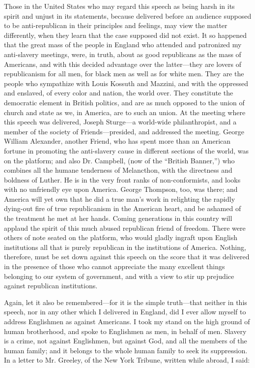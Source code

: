 Those in the United States who may regard this speech as being harsh in
its spirit and unjust in its statements, because delivered before an
audience supposed to be anti-republican in their principles and
feelings, may view the matter differently, when they learn that the case
supposed did not exist. It so happened that the great mass of the people
in England who attended and patronized my anti-slavery meetings, were,
in truth, about as good republicans as the mass of Americans, and with
this decided advantage over the latter---they are lovers of
republicanism for all men, for black men as well as for white men. They
are the people who sympathize with Louis Kossuth and Mazzini, and with
the oppressed and enslaved, of every color and nation, the world over.
They constitute the democratic element in British politics, and are as
much opposed to the {}union of church and state as we, in America, are
to such an union. At the meeting where this speech was delivered, Joseph
Sturge---a world-wide philanthropist, and a member of the society of
Friends---presided, and addressed the meeting. George William Alexander,
another Friend, who has spent more than an American fortune in promoting
the anti-slavery cause in different sections of the world, was on the
platform; and also Dr. Campbell, (now of the ``British Banner,'') who
combines all the humane tenderness of Melancthon, with the directness
and boldness of Luther. He is in the very front ranks of
non-conformists, and looks with no unfriendly eye upon America. George
Thompson, too, was there; and America will yet own that he did a true
man's work in relighting the rapidly dying-out fire of true
republicanism in the American heart, and be ashamed of the treatment he
met at her hands. Coming generations in this country will applaud the
spirit of this much abused republican friend of freedom. There were
others of note seated on the platform, who would gladly ingraft upon
English institutions all that is purely republican in the institutions
of America. Nothing, therefore, must be set down against this speech on
the score that it was delivered in the presence of those who cannot
appreciate the many excellent things belonging to our system of
government, and with a view to stir up prejudice against republican
institutions.

Again, let it also be remembered---for it is the simple truth---that
neither in this speech, nor in any other which I delivered in England,
did I ever allow {}myself to address Englishmen as against Americans. I
took my stand on the high ground of human brotherhood, and spoke to
Englishmen as men, in behalf of men. Slavery is a crime, not against
Englishmen, but against God, and all the members of the human family;
and it belongs to the whole human family to seek its suppression. In a
letter to Mr. Greeley, of the New York Tribune, written while abroad, I
said:


